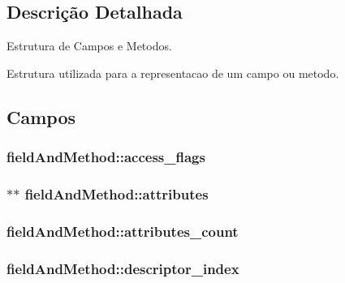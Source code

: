 \subsection{Descrição Detalhada}
Estrutura de Campos e Metodos. 

Estrutura utilizada para a representacao de um campo ou metodo. 

\subsection{Campos}
\hypertarget{structfield_and_method_a04b1604b7553b064887cc578d441d7aa}{}
\subsubsection[{access\+\_\+flags}]{ field\+And\+Method\+::access\+\_\+flags}\label{structfield_and_method_a04b1604b7553b064887cc578d441d7aa}
\hypertarget{structfield_and_method_a1f7d8a1e074f71abf5ba94e0afee627a}{}
\subsubsection[{attributes}]{$\ast$$\ast$ field\+And\+Method\+::attributes}\label{structfield_and_method_a1f7d8a1e074f71abf5ba94e0afee627a}
\hypertarget{structfield_and_method_a0b45411cd7a3167fdcfad1af18a799e5}{}
\subsubsection[{attributes\+\_\+count}]{ field\+And\+Method\+::attributes\+\_\+count}\label{structfield_and_method_a0b45411cd7a3167fdcfad1af18a799e5}
\hypertarget{structfield_and_method_a61c33b04e96966edbfd142eea9992834}{}
\subsubsection[{descriptor\+\_\+index}]{ field\+And\+Method\+::descriptor\+\_\+index}\label{structfield_and_method_a61c33b04e96966edbfd142eea9992834}
\hypertarget{structfield_and_method_ac636d7076db5a2ce9891613be8ad9b00}{}
